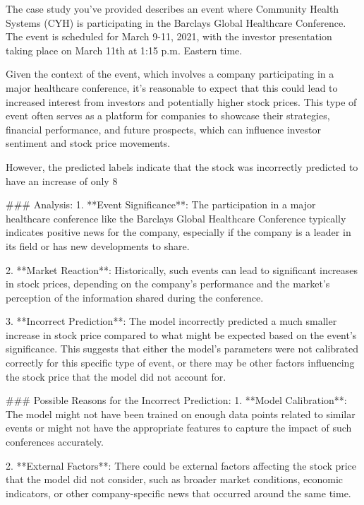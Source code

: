 The case study you've provided describes an event where Community Health Systems (CYH) is participating in the Barclays Global Healthcare Conference. The event is scheduled for March 9-11, 2021, with the investor presentation taking place on March 11th at 1:15 p.m. Eastern time.

Given the context of the event, which involves a company participating in a major healthcare conference, it's reasonable to expect that this could lead to increased interest from investors and potentially higher stock prices. This type of event often serves as a platform for companies to showcase their strategies, financial performance, and future prospects, which can influence investor sentiment and stock price movements.

However, the predicted labels indicate that the stock was incorrectly predicted to have an increase of only 8%

### Analysis:
1. **Event Significance**: The participation in a major healthcare conference like the Barclays Global Healthcare Conference typically indicates positive news for the company, especially if the company is a leader in its field or has new developments to share.
   
2. **Market Reaction**: Historically, such events can lead to significant increases in stock prices, depending on the company's performance and the market's perception of the information shared during the conference.

3. **Incorrect Prediction**: The model incorrectly predicted a much smaller increase in stock price compared to what might be expected based on the event's significance. This suggests that either the model's parameters were not calibrated correctly for this specific type of event, or there may be other factors influencing the stock price that the model did not account for.

### Possible Reasons for the Incorrect Prediction:
1. **Model Calibration**: The model might not have been trained on enough data points related to similar events or might not have the appropriate features to capture the impact of such conferences accurately.
   
2. **External Factors**: There could be external factors affecting the stock price that the model did not consider, such as broader market conditions, economic indicators, or other company-specific news that occurred around the same time.


